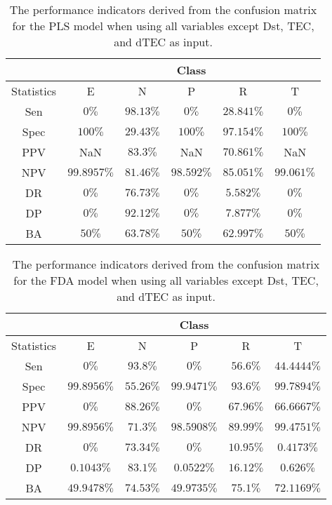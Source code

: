 \begin{table}[!ht]
	\centering
	\begin{tabular}{|c|c|c|c|c|c|}
		\hline
		 & \multicolumn{5}{c|}{Class} \\ \hline
		Statistics & E & N & P & R & T \\ \hline
		Sen & $0\%$ & $98.13\%$ & $0\%$ & $28.841\%$ & $0\%$ \\ \hline
		Spec & $100\%$ & $29.43\%$ & $100\%$ & $97.154\%$ & $100\%$ \\ \hline
		PPV & NaN & $83.3\%$ & NaN & $70.861\%$ & NaN \\ \hline
		NPV & $99.8957\%$ & $81.46\%$ & $98.592\%$ & $85.051\%$ & $99.061\%$ \\ \hline
		DR & $0\%$ & $76.73\%$ & $0\%$ & $5.582\%$ & $0\%$ \\ \hline
		DP & $0\%$ & $92.12\%$ & $0\%$ & $7.877\%$ & $0\%$ \\ \hline
		BA & $50\%$ & $63.78\%$ & $50\%$ & $62.997\%$ & $50\%$ \\ \hline
	\end{tabular}
	\caption{The performance indicators derived from the confusion matrix for the PLS model when using all variables except Dst, TEC, and dTEC as input.}
	\label{tab:cs:reverse:noTEC:pls}
\end{table}

\begin{table}[!ht]
	\centering
	\begin{tabular}{|c|c|c|c|c|c|}
		\hline
		 & \multicolumn{5}{c|}{Class} \\ \hline
		Statistics & E & N & P & R & T \\ \hline
		Sen & $0\%$ & $93.8\%$ & $0\%$ & $56.6\%$ & $44.4444\%$ \\ \hline
		Spec & $99.8956\%$ & $55.26\%$ & $99.9471\%$ & $93.6\%$ & $99.7894\%$ \\ \hline
		PPV & $0\%$ & $88.26\%$ & $0\%$ & $67.96\%$ & $66.6667\%$ \\ \hline
		NPV & $99.8956\%$ & $71.3\%$ & $98.5908\%$ & $89.99\%$ & $99.4751\%$ \\ \hline
		DR & $0\%$ & $73.34\%$ & $0\%$ & $10.95\%$ & $0.4173\%$ \\ \hline
		DP & $0.1043\%$ & $83.1\%$ & $0.0522\%$ & $16.12\%$ & $0.626\%$ \\ \hline
		BA & $49.9478\%$ & $74.53\%$ & $49.9735\%$ & $75.1\%$ & $72.1169\%$ \\ \hline
	\end{tabular}
	\caption{The performance indicators derived from the confusion matrix for the FDA model when using all variables except Dst, TEC, and dTEC as input.}
	\label{tab:cs:reverse:noTEC:fda}
\end{table}

